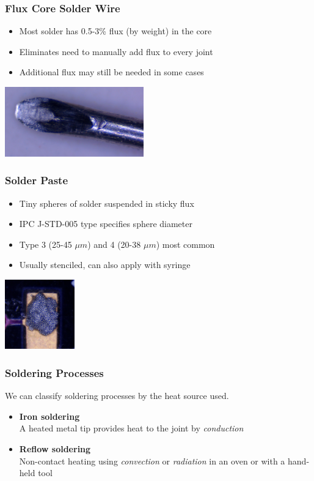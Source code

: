 \documentclass{beamer}
\begin{document}
\begin{frame}
\frametitle{Flux Core Solder Wire}
\begin{itemize}
\item Most solder has 0.5-3\% flux (by weight) in the core
\item Eliminates need to manually add flux to every joint
\item Additional flux may still be needed in some cases
\end{itemize}
\begin{center}
\includegraphics[width=6cm,keepaspectratio]{flux-core.jpg}
\end{center}
\end{frame}

\begin{frame}
\frametitle{Solder Paste}
\begin{itemize}
\item Tiny spheres of solder suspended in sticky flux
\item IPC J-STD-005 type specifies sphere diameter
\item Type 3 (25-45 $\mu m$) and 4 (20-38 $\mu m$) most common
\item Usually stenciled, can also apply with syringe
\end{itemize}
\begin{center}
\includegraphics[height=3cm,keepaspectratio]{solder-paste.jpg}
\end{center}
\end{frame}

\begin{frame}
\frametitle{Soldering Processes}
We can classify soldering processes by the heat source used.
\begin{itemize}
\item \textbf{Iron soldering} \\
A heated metal tip provides heat to the joint by \emph{conduction}
\item \textbf{Reflow soldering} \\
Non-contact heating using \emph{convection} or \emph{radiation} in an oven or with a hand-held tool
\end{itemize}
\end{frame}
\end{document}
